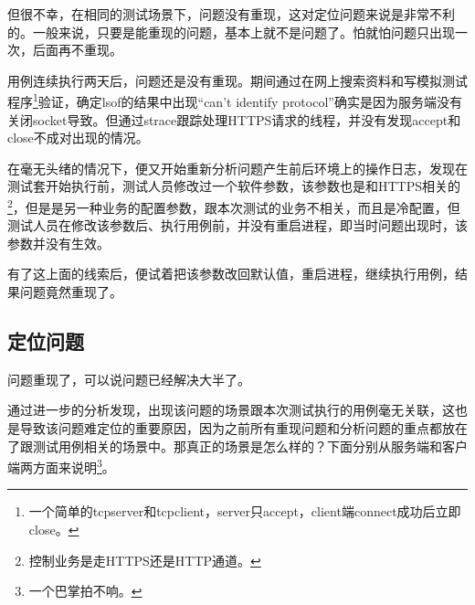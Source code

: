 \documentclass[a4paper, 11pt, titlepage]{article}
\begin{document}
但很不幸，在相同的测试场景下，问题没有重现，这对定位问题来说是非常不利的。一般来说，只要是能重现的问题，基本上就不是问题了。怕就怕问题只出现一次，后面再不重现。

用例连续执行两天后，问题还是没有重现。期间通过在网上搜索资料和写模拟测试程序\footnote{一个简单的tcpserver和tcpclient，server只accept，client端connect成功后立即close。}验证，确定lsof的结果中出现“can't identify protocol”确实是因为服务端没有关闭socket导致。但通过strace跟踪处理HTTPS请求的线程，并没有发现accept和close不成对出现的情况。

在毫无头绪的情况下，便又开始重新分析问题产生前后环境上的操作日志，发现在测试套开始执行前，测试人员修改过一个软件参数，该参数也是和HTTPS相关的\footnote{控制业务是走HTTPS还是HTTP通道。}，但是是另一种业务的配置参数，跟本次测试的业务不相关，而且是冷配置，但测试人员在修改该参数后、执行用例前，并没有重启进程，即当时问题出现时，该参数并没有生效。

有了这上面的线索后，便试着把该参数改回默认值，重启进程，继续执行用例，结果问题竟然重现了。

\subsection{定位问题}
问题重现了，可以说问题已经解决大半了。

通过进一步的分析发现，出现该问题的场景跟本次测试执行的用例毫无关联，这也是导致该问题难定位的重要原因，因为之前所有重现问题和分析问题的重点都放在了跟测试用例相关的场景中。那真正的场景是怎么样的？下面分别从服务端和客户端两方面来说明\footnote{一个巴掌拍不响。}。
\end{document}
